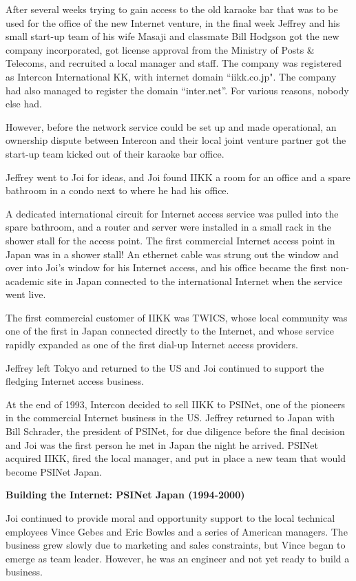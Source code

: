 After several weeks trying to gain access to the old karaoke bar that was to be used for the office of the new Internet venture, in the final week Jeffrey and his small start-up team of his wife Masaji and classmate Bill Hodgson got the new company incorporated, got license approval from the Ministry of Posts \& Telecoms, and recruited a local manager and staff. The company was registered as Intercon International KK, with internet domain “iikk.co.jp". The company had also managed to register the domain “inter.net”. For various reasons, nobody else had. 

However, before the network service could be set up and made operational, an ownership dispute between Intercon and their local joint venture partner got the start-up team kicked out of their karaoke bar office.

Jeffrey went to Joi for ideas, and Joi found IIKK a room for an office and a spare bathroom in a condo next to where he had his office.

A dedicated international circuit for Internet access service was pulled into the spare bathroom, and a router and server were installed in a small rack in the shower stall for the access point. The first commercial Internet access point in Japan was in a shower stall! An ethernet cable was strung out the window and over into Joi's window for his Internet access, and his office became the first non-academic site in Japan connected to the international Internet when the service went live.

The first commercial customer of IIKK was TWICS, whose local community was one of the first in Japan connected directly to the Internet, and whose service rapidly expanded as one of the first dial-up Internet access providers.

Jeffrey left Tokyo and returned to the US and Joi continued to support the fledging Internet access business.

At the end of 1993, Intercon decided to sell IIKK to PSINet, one of the pioneers in the commercial Internet business in the US. Jeffrey returned to Japan with Bill Schrader, the president of PSINet, for due diligence before the final decision and Joi was the first person he met in Japan the night he arrived. PSINet acquired IIKK, fired the local manager, and put in place a new team that would become PSINet Japan.


\textbf{Building the Internet: PSINet Japan (1994-2000)}

Joi continued to provide moral and opportunity support to the local technical employees Vince Gebes and Eric Bowles and a series of American managers. The business grew slowly due to marketing and sales constraints, but Vince began to emerge as team leader. However, he was an engineer and not yet ready to build a business.

